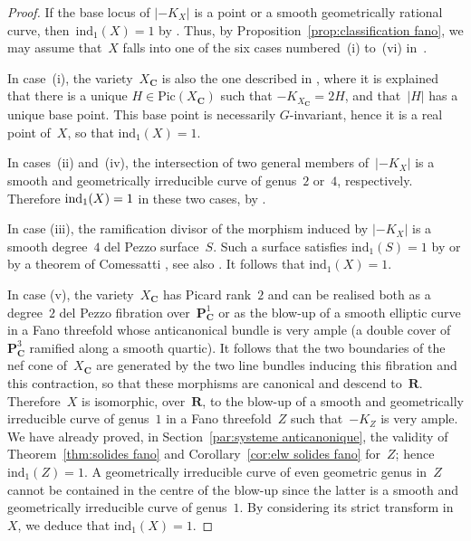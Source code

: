 \documentclass[JEP,XML,SOM,Unicode]{cedram}
\theoremstyle{plain}
\theoremstyle{definition}
\numberwithin{equation}{section}
\renewcommand{\C}{{\mathbf C}}
\renewcommand{\P}{{\mathbf P}}
\newcommand{\R}{{\mathbf R}}
\newcommand{\Pic}{\mathrm{Pic}}
\newcommand{\elw}{\mathrm{ind}}
\begin{document}
\begin{proof}
If the base locus of $|{-}K_X|$ is a point or a smooth geometrically rational curve,
then~$\elw_1(X)=1$
by \cite[Cor.\,\ref*{BW1-cor:what is elw1}]{BW1}.
Thus, by Proposition~\ref{prop:classification fano}, we may assume
that~$X$ falls into one of the six cases numbered~(i) to~(vi) in~\cite[Th.\,2.1.16]{fanorusse}.

In case~(i), the variety~$X_\C$ is also the one described in
\cite[Th.\,2.4.5\,(i)\,a)]{fanorusse}, where it is explained that there is
a unique $H \in \Pic(X_\C)$ such that $-K_{X_{\C}}=2H$, and that~$|H|$ has
a unique base point. This base point is necessarily $G$\nobreakdash-invariant, hence it is a real point of~$X$,
so that $\elw_1(X)=1$.

In cases~(ii) and~(iv), the intersection of two general members of~$|{-}K_X|$ is a smooth and geometrically irreducible
curve of genus~$2$ or~$4$, respectively.
Therefore $\elw_1(X)=\nobreak1$ in these two cases,
by \cite[Cor.\,\ref*{BW1-cor:what is elw1}]{BW1}.

In case (iii), the ramification divisor of the morphism induced by $|{-}K_X|$ is a smooth degree~$4$ del Pezzo surface~$S$.
Such a surface satisfies $\elw_1(S)=1$ by \cite[Cor.\,\ref*{BW1-cor:surfaces}\,(ii)]{BW1}
or by a theorem of Comessatti \cite[discussion below Th.\,VI, p.\,60]{comessatti},
see also \cite{colliotsanspoint}. It follows that $\elw_1(X)=1$.

In case (v), the variety~$X_\C$ has Picard rank~$2$ and can be realised both
as a degree~$2$ del Pezzo fibration over~$\P^1_\C$ or as the blow-up of a smooth
elliptic curve in a Fano threefold
whose anticanonical bundle
is very ample
(a double cover of~$\P^3_\C$ ramified
along a smooth quartic). It follows that the two boundaries of the nef
cone of~$X_\C$ are generated by the two line bundles inducing this
fibration and this contraction, so that these morphisms are canonical and
descend to~$\R$.
Therefore~$X$ is isomorphic, over~$\R$, to the blow-up
of a smooth and geometrically irreducible curve of genus~$1$ in
a Fano threefold~$Z$ such that~$-K_Z$ is very ample.
We have already proved,
in Section~\ref{par:systeme anticanonique},
the validity of Theorem~\ref{thm:solides fano} and Corollary~\ref{cor:elw solides fano}
for~$Z$; hence $\elw_1(Z)=1$.
A geometrically irreducible curve of even geometric genus in~$Z$ cannot be contained in
the centre of the blow-up since the latter is a smooth and geometrically irreducible curve of genus~$1$.
By considering its strict
transform in~$X$, we deduce that $\elw_1(X)=1$.


\end{proof}
\end{document}
